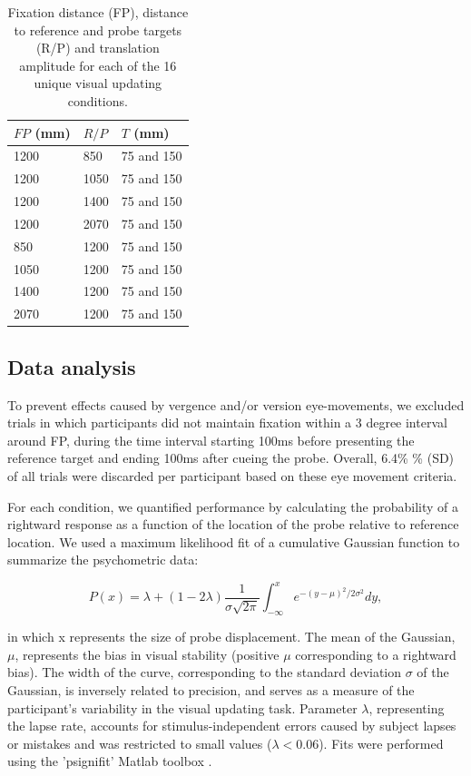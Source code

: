 \begin{table}    
    \begin{tabular}{lll}
    $FP$ (mm) & $R/P$ & $T$ (mm) \\
    \hline
    1200 & 850 & 75 and 150 \\
    1200 & 1050 & 75 and 150 \\
    1200 & 1400 & 75 and 150 \\
    1200 & 2070 & 75 and 150 \\
    850 & 1200 & 75 and 150 \\    
    1050 & 1200 & 75 and 150 \\
    1400 & 1200 & 75 and 150 \\
    2070 & 1200 & 75 and 150 \\
    \end{tabular}
    
    \caption{Fixation distance (FP), distance to reference and probe targets (R/P) and translation amplitude for each of the 16 unique visual updating conditions.}
    
    \label{p2:tab1}
\end{table}

\subsection{Data analysis}

To prevent effects caused by vergence and/or version eye-movements, we excluded trials in which participants did not maintain fixation within a 3 degree interval around FP, during the time interval starting 100ms before presenting the reference target and ending 100ms after cueing the probe. Overall, 6.4\% \% ({\textpm}SD) of all trials were discarded per participant based on these eye movement criteria. 

For each condition, we quantified performance by calculating the probability of a rightward response as a function of the location of the probe relative to reference location. We used a maximum likelihood fit of a cumulative Gaussian function to summarize the psychometric data:

\begin{equation}
\label{p2:eq1}
P(x) = \lambda + (1 - 2\lambda) \frac{1}{\sigma \sqrt{2\pi}} \int_{-\infty}^{x}{e^{-(y-\mu)^2 / 2\sigma^2}}dy,
\end{equation}

in which x represents the size of probe displacement. The mean of the Gaussian, $\mu$, represents the bias in visual stability (positive $\mu$ corresponding to a rightward bias). The width of the curve, corresponding to the standard deviation $\sigma$ of the Gaussian, is inversely related to precision, and serves as a measure of the participant's variability in the visual updating task. Parameter $\lambda$, representing the lapse rate, accounts for stimulus-independent errors caused by subject lapses or mistakes and was restricted to small values ($\lambda < 0.06$). Fits were performed using the 'psignifit' Matlab toolbox \cite{wichmann2001, wichmann2001b}.


